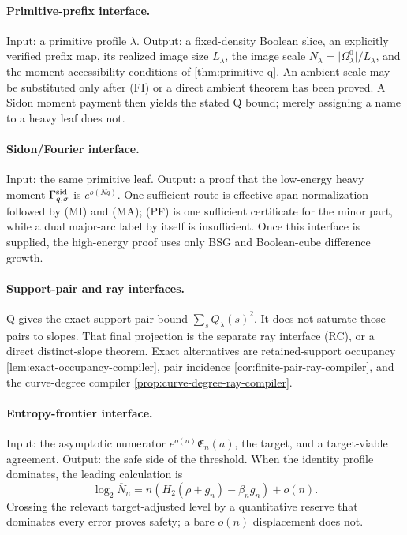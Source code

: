 \documentclass[12pt,a4paper]{amsart}
\numberwithin{equation}{section}
\theoremstyle{remark}
\newcommand{\Gsid}{\Gamma^{\rm sid}}
\newcommand{\barN}{\overline N}
\newcommand{\abs}[1]{\lvert #1\rvert}
\begin{document}
\paragraph{Primitive-prefix interface.}
Input: a primitive profile \(\lambda\).  Output: a fixed-density Boolean
slice, an explicitly verified prefix map, its realized image size
\(L_\lambda\), the image scale
\(\barN_\lambda=\abs{\Omega^0_\lambda}/L_\lambda\), and the
moment-accessibility conditions of \cref{thm:primitive-q}.  An ambient
scale may be substituted only after \textup{(FI)} or a direct ambient
theorem has been proved.  A Sidon moment payment then yields the stated Q
bound; merely assigning a name to a heavy leaf does not.

\paragraph{Sidon/Fourier interface.}
Input: the same primitive leaf.  Output: a proof that the low-energy heavy
moment \(\Gsid_{q,\sigma}\) is \(e^{o(Nq)}\).  One sufficient route is
effective-span normalization followed by \textup{(MI)} and
\textup{(MA)}; \textup{(PF)} is one sufficient certificate for the minor
part, while a dual major-arc label by itself is insufficient.  Once this
interface is supplied, the high-energy proof uses only BSG and
Boolean-cube difference growth.

\paragraph{Support-pair and ray interfaces.}
Q gives the exact support-pair bound \(\sum_sQ_\lambda(s)^2\).  It does
not saturate those pairs to slopes.  That final projection is the separate
ray interface \textup{(RC)}, or a direct distinct-slope theorem.
Exact alternatives are retained-support occupancy
\cref{lem:exact-occupancy-compiler}, pair incidence
\cref{cor:finite-pair-ray-compiler}, and the curve-degree compiler
\cref{prop:curve-degree-ray-compiler}.

\paragraph{Entropy-frontier interface.}
Input: the asymptotic numerator \(e^{o(n)}\mathfrak E_n(a)\), the target,
and a target-viable agreement.  Output: the safe side of the threshold.
When the identity profile dominates, the leading calculation is
\[
        \log_2\barN_n=n(H_2(\rho+g_n)-\beta_ng_n)+o(n).
\]
Crossing the relevant target-adjusted level by a quantitative reserve that
dominates every error proves safety; a bare \(o(n)\) displacement does not.
\end{document}
